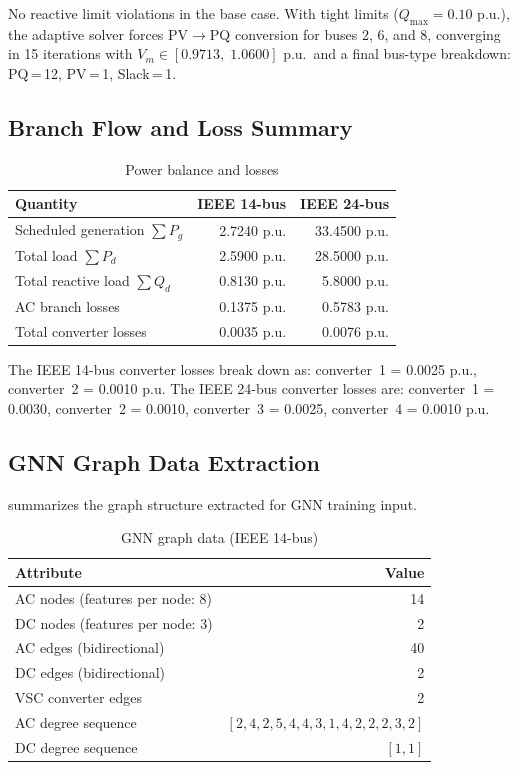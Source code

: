 \documentclass[11pt]{article}
\begin{document}
No reactive limit violations in the base case. With tight limits ($Q_{\max} = 0.10$ p.u.), the adaptive solver forces PV$\to$PQ conversion for buses 2, 6, and 8, converging in 15 iterations with $V_m \in [0.9713,\; 1.0600]$ p.u.\ and a final bus-type breakdown: PQ\,=\,12, PV\,=\,1, Slack\,=\,1.

\subsection{Branch Flow and Loss Summary}

\begin{table}[h]
\centering
\caption{Power balance and losses}
\label{tab:losses}
\begin{tabular}{l r r}
\toprule
Quantity & IEEE 14-bus & IEEE 24-bus \\
\midrule
Scheduled generation $\sum P_g$ & 2.7240 p.u. & 33.4500 p.u. \\
Total load $\sum P_d$           & 2.5900 p.u. & 28.5000 p.u. \\
Total reactive load $\sum Q_d$  & 0.8130 p.u. &  5.8000 p.u. \\
AC branch losses                & 0.1375 p.u. &  0.5783 p.u. \\
Total converter losses          & 0.0035 p.u. &  0.0076 p.u. \\
\bottomrule
\end{tabular}
\end{table}

The IEEE 14-bus converter losses break down as: converter~1 = 0.0025 p.u., converter~2 = 0.0010 p.u.  The IEEE 24-bus converter losses are: converter~1 = 0.0030, converter~2 = 0.0010, converter~3 = 0.0025, converter~4 = 0.0010 p.u.

\subsection{GNN Graph Data Extraction}

 summarizes the graph structure extracted for GNN training input.

\begin{table}[h]
\centering
\caption{GNN graph data (IEEE 14-bus)}
\label{tab:gnn_data}
\begin{tabular}{l r}
\toprule
Attribute & Value \\
\midrule
AC nodes (features per node: 8) & 14 \\
DC nodes (features per node: 3) & 2 \\
AC edges (bidirectional) & 40 \\
DC edges (bidirectional) & 2 \\
VSC converter edges & 2 \\
AC degree sequence & $[2,4,2,5,4,4,3,1,4,2,2,2,3,2]$ \\
DC degree sequence & $[1,1]$ \\
\bottomrule
\end{tabular}
\end{table}
\end{document}
